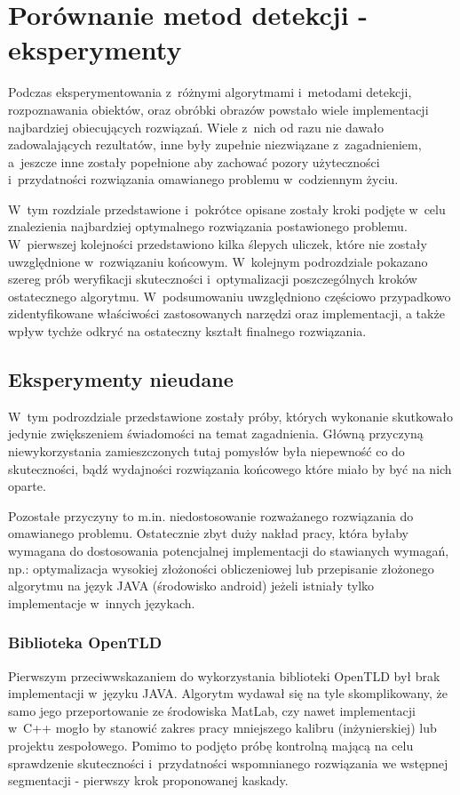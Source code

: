 \chapter{Porównanie metod detekcji - eksperymenty}

Podczas eksperymentowania z~różnymi algorytmami i~metodami detekcji,
rozpoznawania obiektów, oraz obróbki obrazów powstało wiele implementacji
najbardziej obiecujących rozwiązań. Wiele z~nich od razu nie dawało 
zadowalających rezultatów, inne były zupełnie niezwiązane z~zagadnieniem,
a~jeszcze inne zostały popełnione aby zachować pozory użyteczności 
i~przydatności rozwiązania omawianego problemu w~codziennym życiu.

W~tym rozdziale przedstawione i~pokrótce opisane zostały kroki podjęte
w~celu znalezienia najbardziej optymalnego rozwiązania postawionego 
problemu. 
W~pierwszej kolejności przedstawiono kilka ślepych uliczek, które 
nie zostały uwzględnione w~rozwiązaniu końcowym. W~kolejnym podrozdziale
pokazano szereg prób weryfikacji skuteczności i~optymalizacji 
poszczególnych kroków ostatecznego algorytmu. W~podsumowaniu uwzględniono
częściowo przypadkowo zidentyfikowane właściwości zastosowanych
narzędzi oraz implementacji, a także wpływ tychże odkryć na ostateczny
kształt finalnego rozwiązania.

\section{Eksperymenty nieudane}

W~tym podrozdziale przedstawione zostały próby, których wykonanie
skutkowało jedynie zwiększeniem świadomości na temat zagadnienia.
Główną przyczyną niewykorzystania zamieszczonych tutaj pomysłów
była niepewność co do skuteczności, bądź wydajności rozwiązania końcowego
które miało by być na nich oparte.

Pozostałe przyczyny to m.in. niedostosowanie rozważanego rozwiązania
do omawianego problemu. Ostatecznie zbyt duży nakład pracy, która
byłaby wymagana do dostosowania potencjalnej implementacji do
stawianych wymagań, np.: optymalizacja wysokiej złożoności obliczeniowej
lub przepisanie złożonego algorytmu na język JAVA (środowisko android)
jeżeli istniały tylko implementacje w~innych językach.

\subsection{Biblioteka OpenTLD}

Pierwszym przeciwwskazaniem do wykorzystania biblioteki OpenTLD 
był brak implementacji w~języku JAVA. Algorytm wydawał się na tyle
skomplikowany, że samo jego przeportowanie ze środowiska MatLab,
czy nawet implementacji w~C++ mogło by stanowić zakres pracy
mniejszego kalibru (inżynierskiej) lub projektu zespołowego.
Pomimo to podjęto próbę kontrolną mającą na celu sprawdzenie
skuteczności i~przydatności wspomnianego rozwiązania we wstępnej 
segmentacji - pierwszy krok proponowanej kaskady.

